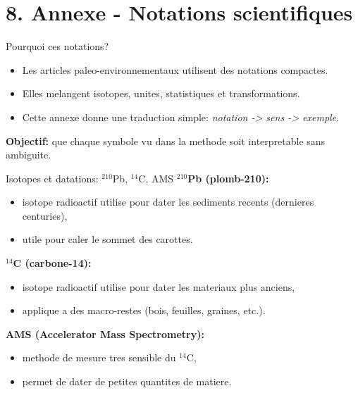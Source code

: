 \documentclass[aspectratio=169,11pt]{beamer}
\begin{document}
\section{8. Annexe - Notations scientifiques}

\begin{frame}{Pourquoi ces notations?}
\begin{itemize}
  \item Les articles paleo-environnementaux utilisent des notations compactes.
  \item Elles melangent isotopes, unites, statistiques et transformations.
  \item Cette annexe donne une traduction simple: \textit{notation -> sens -> exemple}.
\end{itemize}

\vspace{0.2cm}
\textbf{Objectif:} que chaque symbole vu dans la methode soit interpretable sans ambiguite.
\end{frame}

\begin{frame}{Isotopes et datations: \(^{210}\)Pb, \(^{14}\)C, AMS}
\textbf{\(^{210}\)Pb (plomb-210):}
\begin{itemize}
  \item isotope radioactif utilise pour dater les sediments recents (dernieres centuries),
  \item utile pour caler le sommet des carottes.
\end{itemize}

\textbf{\(^{14}\)C (carbone-14):}
\begin{itemize}
  \item isotope radioactif utilise pour dater les materiaux plus anciens,
  \item applique a des macro-restes (bois, feuilles, graines, etc.).
\end{itemize}

\textbf{AMS (Accelerator Mass Spectrometry):}
\begin{itemize}
  \item methode de mesure tres sensible du \(^{14}\)C,
  \item permet de dater de petites quantites de matiere.
\end{itemize}
\end{frame}
\end{document}
